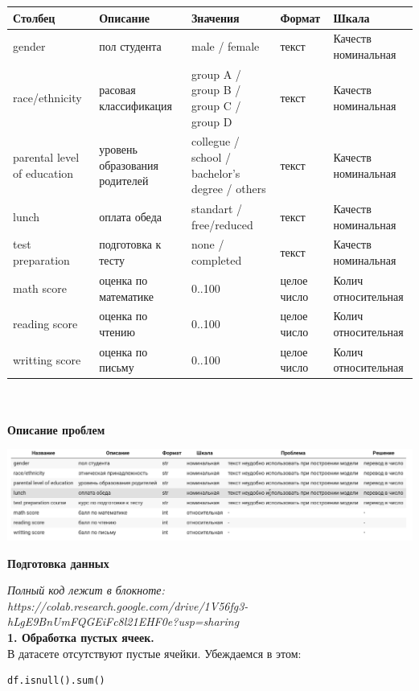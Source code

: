 \documentclass[12pt,a4paper]{article}
\begin{document}
\begin{tabular}{ | p{100pt} | p{100pt} | p{100pt} | p{40pt} | p{60pt} |}
\hline
Столбец & Описание & Значения & Формат & Шкала  \\ \hline
gender & пол студента & male / female & текст & Качеств номинальная \\ \hline
race/ethnicity & расовая классификация & group A / group B / group C / group D & текст & Качеств номинальная  \\ \hline
parental level of education & уровень образования родителей & collegue / school / bachelor's degree / others  & текст & Качеств номинальная  \\ \hline
lunch & оплата обеда & standart / free/reduced & текст & Качеств номинальная  \\ \hline
test preparation & подготовка к тесту & none / completed & текст & Качеств номинальная  \\ \hline
math score & оценка по математике & 0..100 & целое число & Колич относительная  \\ \hline
reading score & оценка по чтению & 0..100 & целое число & Колич относительная  \\ \hline
writting score & оценка по письму & 0..100 & целое число & Колич относительная  \\ \hline
\end{tabular}
\\
\\

\large \textbf{Описание проблем}

\includegraphics[scale=0.5]{table}


\newpage
\large \textbf{Подготовка данных}

\textit{Полный код лежит в блокноте: 
\\ https://colab.research.google.com/drive/1V56fg3-hLgE9BnUmFQGEiFc8l21EHF0e?usp=sharing}\\

\textbf{1. Обработка пустых ячеек.} \\
В датасете отсутствуют пустые ячейки. Убеждаемся в этом:

\begin{verbatim}
df.isnull().sum()
\end{verbatim}
\end{document}
